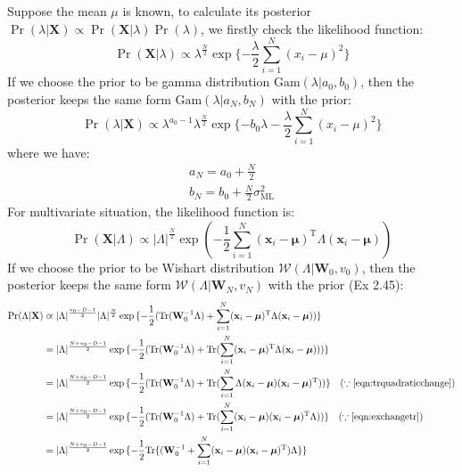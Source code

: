 Suppose the mean $\mu$ is known, to  calculate its posterior $\Pr(\lambda\vert\mathbf{X})\varpropto\Pr(\mathbf{X}\vert\lambda)\Pr(\lambda)$, we firstly check the likelihood function:
\begin{equation}
\Pr(\mathbf{X}\vert\lambda)\varpropto\lambda^{\frac{N}{2}}\exp{}\{-\frac{\lambda}{2}\sum_{i=1}^{N}(x_{i}-\mu)^2\}
\end{equation}
If we choose the prior to be gamma distribution $\text{Gam}(\lambda\vert{}a_0,b_0)$, then the posterior keeps the same form $\text{Gam}(\lambda\vert{}a_{N},b_{N})$ with the prior:
\begin{equation}
\Pr(\lambda\vert\mathbf{X})\varpropto{}\lambda^{a_{0}-1}\lambda^{\frac{N}{2}}\exp{}\{-b_{0}\lambda-\frac{\lambda}{2}\sum_{i=1}^{N}(x_{i}-\mu)^2\}
\end{equation}
where we have:
\begin{gather}
a_{N}=a_{0}+\frac{N}{2}\\
b_{N}=b_{0}+\frac{N}{2}\sigma^{2}_{\text{ML}}
\end{gather}
For multivariate situation, the likelihood function is:
\begin{equation}
\Pr(\mathbf{X}\vert\Lambda)\varpropto\vert\Lambda\vert^{\frac{N}{2}}\exp{}(-\frac{1}{2}\sum_{i=1}^{N}(\mathbf{x}_{i}-\boldsymbol{\mu})^{\mathrm{T}}\Lambda(\mathbf{x}_{i}-\boldsymbol{\mu}))
\end{equation}
If we choose the prior to be Wishart distribution $\mathcal{W}(\Lambda\vert\mathbf{W}_{0},v_{0})$, then the posterior keeps the same form $\mathcal{W}(\Lambda\vert\mathbf{W}_{N},v_{N})$ with the prior (Ex 2.45):
\begin{equation}
\begin{split}
\Pr(\Lambda\vert\mathbf{X})&\varpropto{}\vert\Lambda\vert^{\frac{v_{0}-D-1}{2}}\vert\Lambda\vert^{\frac{N}{2}}\exp{}\{-\frac{1}{2}(\text{Tr}(\mathbf{W}_{0}^{-1}\Lambda)+\sum_{i=1}^{N}(\mathbf{x}_{i}-\boldsymbol{\mu})^{\mathrm{T}}\Lambda(\mathbf{x}_{i}-\boldsymbol{\mu}))\}\\
&=\vert\Lambda\vert^{\frac{N+v_{0}-D-1}{2}}\exp{}\{-\frac{1}{2}(\text{Tr}(\mathbf{W}_{0}^{-1}\Lambda)+\text{Tr}(\sum_{i=1}^{N}(\mathbf{x}_{i}-\boldsymbol{\mu})^{\mathrm{T}}\Lambda(\mathbf{x}_{i}-\boldsymbol{\mu})))\}\\
&=\vert\Lambda\vert^{\frac{N+v_{0}-D-1}{2}}\exp{}\{-\frac{1}{2}(\text{Tr}(\mathbf{W}_{0}^{-1}\Lambda)+\text{Tr}(\sum_{i=1}^{N}\Lambda(\mathbf{x}_{i}-\boldsymbol{\mu})(\mathbf{x}_{i}-\boldsymbol{\mu})^{\mathrm{T}}))\}\quad{}(\because\text{\eqref{eqn:trquadraticchange}})\\
&=\vert\Lambda\vert^{\frac{N+v_{0}-D-1}{2}}\exp{}\{-\frac{1}{2}(\text{Tr}(\mathbf{W}_{0}^{-1}\Lambda)+\text{Tr}(\sum_{i=1}^{N}(\mathbf{x}_{i}-\boldsymbol{\mu})(\mathbf{x}_{i}-\boldsymbol{\mu})^{\mathrm{T}}\Lambda))\}\quad{}(\because\text{\eqref{eqn:exchangetr}})\\
&=\vert\Lambda\vert^{\frac{N+v_{0}-D-1}{2}}\exp{}\{-\frac{1}{2}\text{Tr}\{(\mathbf{W}_{0}^{-1}+\sum_{i=1}^{N}(\mathbf{x}_{i}-\boldsymbol{\mu})(\mathbf{x}_{i}-\boldsymbol{\mu})^{\mathrm{T}})\Lambda\}\}\\
\end{split}
\end{equation}
